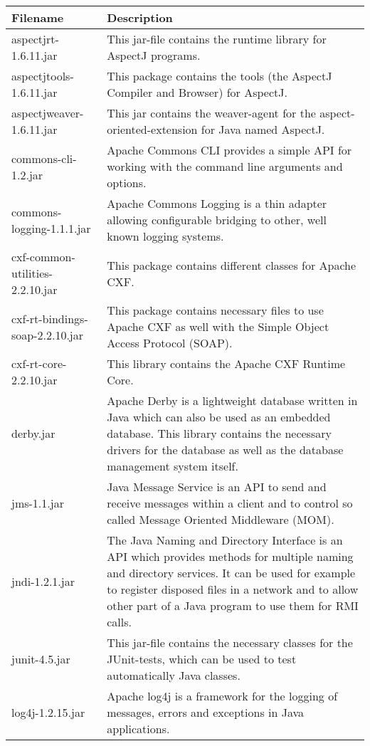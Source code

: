 \begin{center}
\begin{longtable}{|p{}|p{}|}
\hline 
Filename & Description\\
\hline
\hline 
aspectjrt-1.6.11.jar & This jar-file contains the runtime library for AspectJ programs.\\
\hline 
aspectjtools-1.6.11.jar & This package contains the tools (the AspectJ Compiler and Browser) for AspectJ.\\
\hline 
aspectjweaver-1.6.11.jar & This jar contains the weaver-agent for the aspect-oriented-extension for Java named AspectJ.\\
\hline 
commons-cli-1.2.jar & Apache Commons CLI provides a simple API for working with the command line arguments and options.\\
\hline 
commons-logging-1.1.1.jar & Apache Commons Logging is a thin adapter allowing configurable bridging to other, well known logging systems.\\
\hline 
cxf-common-utilities-2.2.10.jar & This package contains different classes for Apache CXF.\\
\hline 
cxf-rt-bindings-soap-2.2.10.jar & This package contains necessary files to use Apache CXF as well with the Simple Object Access Protocol (SOAP).\\
\hline 
cxf-rt-core-2.2.10.jar & This library contains the Apache CXF Runtime Core.\\
\hline 
derby.jar & Apache Derby is a lightweight database written in Java which can also be used as an embedded database. This library contains the necessary drivers for the database as well as the database management system itself.\\
\hline 
jms-1.1.jar & Java Message Service is an API to send and receive messages within a client and to control so called Message Oriented Middleware (MOM).\\
\hline 
jndi-1.2.1.jar & The Java Naming and Directory Interface is an API which provides methods for multiple naming and directory services. It can be used for example to register disposed files in a network and to allow other part of a Java program to use them for RMI calls.\\
\hline 
junit-4.5.jar & This jar-file contains the necessary classes for the JUnit-tests, which can be used to test automatically Java classes.\\
\hline 
log4j-1.2.15.jar & Apache log4j is a framework for the logging of messages, errors and exceptions in Java applications.\\

\end{longtable}
\end{center}
